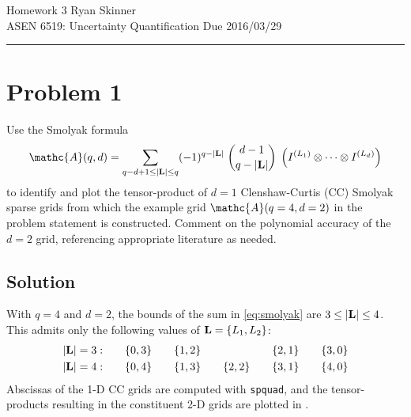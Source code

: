 \documentclass[11pt]{article}
\begin{document}
\newcommand{\widesim}[2][1.5]{
  \mathrel{\overset{#2}{\scalebox{#1}[1]{$\sim$}}}
}

\pagestyle{fancyplain}
\lhead{}
\chead{}
\rhead{}
\cfoot{\hrule \thepage}

\noindent
{\Large Homework 3}
\hfill
{\large Ryan Skinner}
\\[0.5ex]
{\large ASEN 6519: Uncertainty Quantification}
\hfill
{\large Due 2016/03/29}\\
\hrule
\vspace{6pt}

\section*{Problem 1} %

Use the Smolyak formula
\begin{equation}
\mathc{A}(q,d) = \sum_{q-d+1 \le |\mb{L}| \le q} (-1)^{q-|\mb{L}|} \; \binom{d-1}{q-|\mb{L}|} \; \left( I^{(L_1)} \otimes \cdots \otimes I^{(L_d)} \right)
\label{eq:smolyak}
\end{equation}
to identify and plot the tensor-product of $d=1$ Clenshaw-Curtis (CC) Smolyak sparse grids from which the example grid $\mathc{A}(q=4,d=2)$ in the problem statement is constructed. Comment on the polynomial accuracy of the $d=2$ grid, referencing appropriate literature as needed.

\subsection*{Solution}

With $q=4$ and $d=2$, the bounds of the sum in \eqref{eq:smolyak} are $3 \le |\mb{L}| \le 4$. This admits only the following values of $\mb{L} = \{ L_1, L_2 \}$:
\begin{align*}
|\mb{L}| = 3: &\qquad \{ 0,3 \} \qquad \{ 1,2 \} \qquad \hphantom{\{ 2,2 \}} \qquad \{ 2,1 \} \qquad \{ 3,0 \} \\
|\mb{L}| = 4: &\qquad \{ 0,4 \} \qquad \{ 1,3 \} \qquad \{ 2,2 \} \qquad \{ 3,1 \} \qquad \{ 4,0 \}
\end{align*}
Abscissas of the 1-D CC grids are computed with \lstinline|spquad|, and the tensor-products resulting in the constituent 2-D grids are plotted in .
\end{document}
